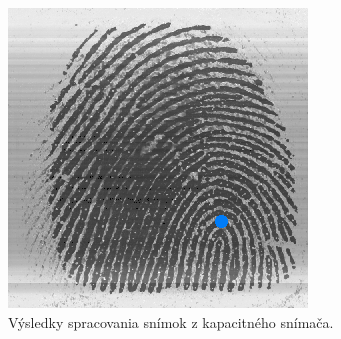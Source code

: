 \begin{figure}[h]
    \includegraphics[width=0.32\linewidth]{obrazky-figures/eval_results/capac_singularities.png}
    \caption{Výsledky spracovania snímok z kapacitného snímača.}
    \label{obr:vyhodnotenie_capac}
  \end{figure}






